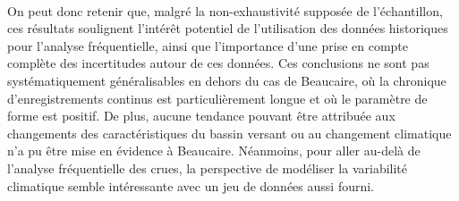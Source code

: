 	\paragraph{} On peut donc retenir que, malgré la non-exhaustivité supposée de l'échantillon, ces résultats soulignent l'intérêt potentiel de l'utilisation des données historiques pour l'analyse fréquentielle, ainsi que l'importance d'une prise en compte complète des incertitudes autour de ces données. Ces conclusions ne sont pas systématiquement généralisables en dehors du cas de Beaucaire, où la chronique d'enregistrements continus est particulièrement longue et où le paramètre de forme est positif. De plus, aucune tendance pouvant être attribuée aux changements des caractéristiques du bassin versant ou au changement climatique n'a pu être mise en évidence à Beaucaire. Néanmoins, pour aller au-delà de l'analyse fréquentielle des crues, la perspective de modéliser la variabilité climatique semble intéressante avec un jeu de données aussi fourni.

%
%
